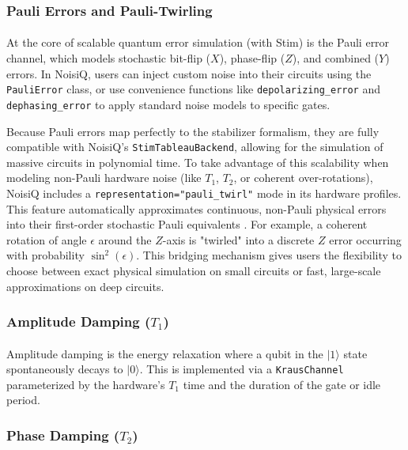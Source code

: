 \documentclass[10pt,twocolumn]{article}
\begin{document}
\subsubsection{Pauli Errors and Pauli-Twirling}
\paragraph{}
    At the core of scalable quantum error simulation (with Stim) is the Pauli error channel, which models stochastic bit-flip ($X$), phase-flip ($Z$), and combined ($Y$) errors. 
In NoisiQ, users can inject custom noise into their circuits using the \texttt{PauliError} class, or use convenience functions like \texttt{depolarizing\_error} and \texttt{dephasing\_error} to apply standard noise models to specific gates. 

    Because Pauli errors map perfectly to the stabilizer formalism, they are fully compatible with NoisiQ's \texttt{StimTableauBackend}, allowing for the simulation of massive circuits in polynomial time. 
To take advantage of this scalability when modeling non-Pauli hardware noise (like $T_1$, $T_2$, or coherent over-rotations), 
NoisiQ includes a \texttt{representation="pauli\_twirl"} mode in its hardware profiles. 
This feature automatically approximates continuous, non-Pauli physical errors into their first-order stochastic Pauli equivalents \cite{geller2013}. 
For example, a coherent rotation of angle $\epsilon$ around the $Z$-axis is "twirled" into a discrete $Z$ error occurring with probability $\sin^2(\epsilon)$. 
This bridging mechanism gives users the flexibility to choose between exact physical simulation on small circuits or fast, large-scale approximations on deep circuits.

\subsubsection{Amplitude Damping ($T_1$)}
\paragraph{}
Amplitude damping is the energy relaxation where a qubit in the $|1\rangle$ state spontaneously decays to $|0\rangle$. 
This is implemented via a \texttt{KrausChannel} parameterized by the hardware's $T_1$ time and the duration of the gate or idle period.

\subsubsection{Phase Damping ($T_2$)}
\end{document}
